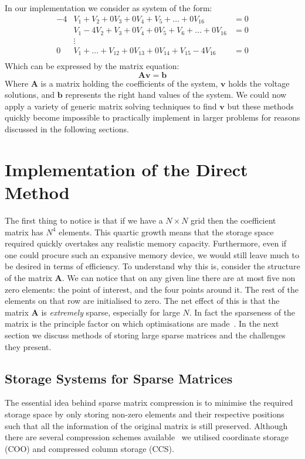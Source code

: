 \documentclass[a4paper]{article}
\newcommand{\mat}[1]{\mathbf{#1}}
\newcommand{\vect}[1]{\bm{#1}}
\begin{document}
In our implementation we consider as system of the form:
\begin{align*}
	-4&V_1+V_2+0V_3+0V_4+V_5+\dots+0V_{16}&=0\\
	&V_1-4V_2+V_3+0V_4+0V_5+V_6+\dots+0V_{16}&=0\\
	&\vdots\\
	0&V_1+\dots+V_{12}+0V_{13}+0V_{14}+V_{15}-4V_{16}&=0\\
\end{align*}
Which can be expressed by the matrix equation:
\begin{equation}
	\mat{A}\vect{v}=\vect{b}
	\label{matEq}
\end{equation}
Where $\mat{A}$ is a matrix holding the coefficients of the system, $\vect{v}$
holds the voltage solutions, and $\vect{b}$ represents the right hand values of
the system. We could now apply a variety of generic matrix solving techniques
to find $\vect{v}$ but these methods quickly become impossible to practically
implement in larger problems for reasons discussed in the following sections.

\section{Implementation of the Direct Method}
The first thing to notice is that if we have a $N\times N$ grid then the
coefficient matrix has $N^4$ elements. This quartic growth means that the
storage space required quickly overtakes any realistic memory capacity.
Furthermore, even if one could procure such an expansive memory device, we
would still leave much to be desired in terms of efficiency. To understand why
this is, consider the structure of the matrix $\mat{A}$. We can notice that on
any given line there are at most five non zero elements: the point of interest,
and the four points around it. The rest of the elements on that row are
initialised to zero. The net effect of this is that the matrix $\mat{A}$ is
\emph{extremely} sparse, especially for large $N$. In fact the sparseness of
the matrix is the principle factor on which optimisations are made~\cite{NR}.
In the next section we discuss methods of storing large sparse matrices and the
challenges they present.

\subsection{Storage Systems for Sparse Matrices}
The essential idea behind sparse matrix compression is to minimise the required
storage space by only storing non-zero elements and their respective positions
such that all the information of the original matrix is still preserved.
Although there are several compression schemes available~\cite{101matstore} we
utilised coordinate storage (COO) and compressed column storage (CCS).
\end{document}
